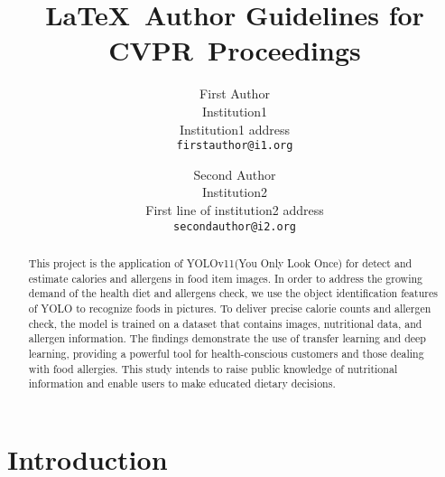 \documentclass[10pt,twocolumn,letterpaper]{article}
\def\confName{CVPR}
\begin{document}
\title{\LaTeX\ Author Guidelines for \confName~Proceedings}

\author{First Author\\
Institution1\\
Institution1 address\\
{\tt\small firstauthor@i1.org}
\and
Second Author\\
Institution2\\
First line of institution2 address\\
{\tt\small secondauthor@i2.org}
}
\maketitle

\begin{abstract}
        This project is the application of YOLOv11(You Only Look Once) for detect and estimate calories and allergens in food item images. In order to address the growing demand of the health diet and allergens check, we use the object identification features of YOLO to recognize foods in pictures.  To deliver precise calorie counts and allergen check, the model is trained on a dataset that contains images, nutritional data, and allergen information. The findings demonstrate the use of transfer learning and deep learning, providing a powerful tool for health-conscious customers and those dealing with food allergies. This study intends to raise public knowledge of nutritional information and enable users to make educated dietary decisions.
\end{abstract}

\section{Introduction}
\label{sec:intro}
\end{document}
